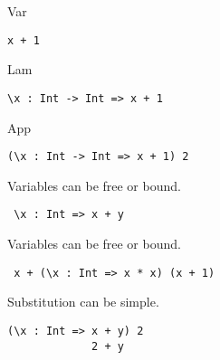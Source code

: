 \documentclass[aspectration=169]{beamer}
\begin{document}
\begin{frame}[fragile]
  \begin{center}
   Var
  \end{center}
  \begin{verbatim}
x + 1
  \end{verbatim}  
\end{frame}

\begin{frame}[fragile]
  \begin{center}
   Lam
  \end{center}
  \begin{verbatim}
\x : Int -> Int => x + 1
  \end{verbatim}  
\end{frame}

\begin{frame}[fragile]
  \begin{center}
   App
  \end{center}
  \begin{verbatim}
(\x : Int -> Int => x + 1) 2
  \end{verbatim}  
\end{frame}

\begin{frame}[fragile]
  \begin{center}
   Variables can be free or bound.
  \end{center}
  \begin{verbatim}
 \x : Int => x + y
  \end{verbatim}  
\end{frame}

\begin{frame}[fragile]
  \begin{center}
   Variables can be free or bound.
  \end{center}
  \begin{verbatim}
 x + (\x : Int => x * x) (x + 1)
  \end{verbatim}  
\end{frame}

\begin{frame}[fragile]
  \begin{center}
   Substitution can be simple.
  \end{center}
  \begin{verbatim}
(\x : Int => x + y) 2
             2 + y
  \end{verbatim}  
\end{frame}
\end{document}
